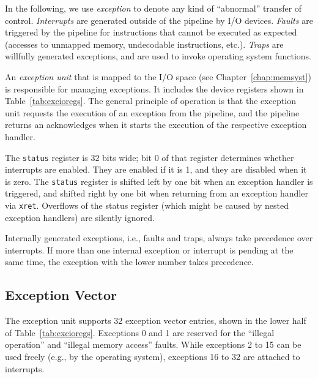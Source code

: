 \documentclass[a4paper,fontsize=10pt,twoside,DIV15,BCOR12mm,headinclude=true,footinclude=false,pagesize,bibtotoc]{scrbook}
\begin{document}
In the following, we use \emph{exception} to denote any kind of
``abnormal'' transfer of control. \emph{Interrupts} are generated
outside of the pipeline by I/O devices. \emph{Faults} are triggered by
the pipeline for instructions that cannot be executed as expected
(accesses to unmapped memory, undecodable instructions,
etc.). \emph{Traps} are willfully generated exceptions, and are used
to invoke operating system functions.

An \emph{exception unit} that is mapped to the I/O space (see
Chapter~\ref{chap:memsyst}) is responsible for managing exceptions. It
includes the device registers shown in Table~\ref{tab:excioregs}. The
general principle of operation is that the exception unit requests the
execution of an exception from the pipeline, and the pipeline returns
an acknowledges when it starts the execution of the respective
exception handler.

The \texttt{status} register is 32 bits wide; bit 0 of that register
determines whether interrupts are enabled. They are enabled if it is
1, and they are disabled when it is zero. The \texttt{status} register
is shifted left by one bit when an exception handler is triggered, and
shifted right by one bit when returning from an exception handler via
\texttt{xret}. Overflows of the status register (which might be caused
by nested exception handlers) are silently ignored.

Internally generated exceptions, i.e., faults and traps, always take
precedence over interrupts. If more than one internal exception or
interrupt is pending at the same time, the exception with the lower
number takes precedence.

\subsection{Exception Vector}

The exception unit supports 32 exception vector entries, shown in the
lower half of Table~\ref{tab:excioregs}. Exceptions 0
and 1 are reserved for the ``illegal operation'' and ``illegal memory
access'' faults. While exceptions 2 to 15 can be used freely (e.g., by
the operating system), exceptions 16 to 32 are attached to interrupts.
\end{document}
